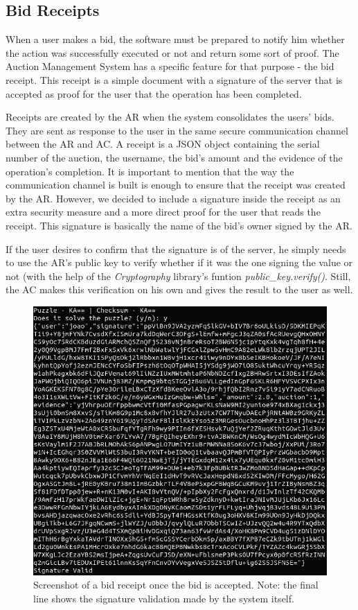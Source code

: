 \documentclass[a4paper]{article}
\begin{document}
\subsection{Bid Receipts}

When a user makes a bid, the software must be prepared to notify him whether the action was successfully executed or not and return some sort of proof.
The Auction Management System has a specific feature for that purpose - the bid receipt.
This receipt is a simple document with a signature of the server that is accepted as proof for the user that the operation has been completed.

Receipts are created by the AR when the system consolidates the users' bids. 
They are sent as response to the user in the same secure communication channel between the AR and AC.
A receipt is a JSON object containing the serial number of the auction, the username, the bid's amount and the evidence of the operation's completion.
It is important to mention that the way the communication channel is built is enough to ensure that the receipt was created by the AR.
However, we decided to include a signature inside the receipt as an extra security measure and a more direct proof for the user that reads the receipt.
This signature is basically the name of the bid's owner signed by the AR.

If the user desires to confirm that the signature is of the server, he simply needs to use the AR's public key to verify whether if it was the one signing the value or not (with the help of the \emph{Cryptography} library's funtion \emph{public\_key.verify()}.
Still, the AC makes this verification on his own and gives the result to the user as well.

\begin{figure}[H]
\centering
\includegraphics[width=0.8\linewidth]{BR.png}
\caption{Screenshot of a bid receipt once the bid is accepted. Note: the final line shows the signature validation made by the system itself.}
\label{fig:br}
\end{figure}
\end{document}
